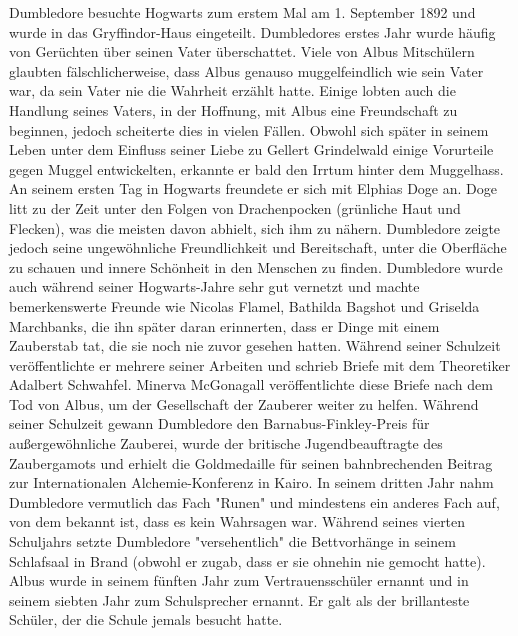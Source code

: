 \documentclass[a4paper, 10pt]{article}
\begin{document}
Dumbledore besuchte Hogwarts zum erstem Mal am 1. September 1892 und wurde in das Gryffindor-Haus eingeteilt. Dumbledores erstes Jahr wurde häufig von Gerüchten über seinen Vater überschattet. Viele von Albus Mitschülern glaubten fälschlicherweise, dass Albus genauso muggelfeindlich wie sein Vater war, da sein Vater nie die Wahrheit erzählt hatte. Einige lobten auch die Handlung seines Vaters, in der Hoffnung, mit Albus eine Freundschaft zu beginnen, jedoch scheiterte dies in vielen Fällen. Obwohl sich später in seinem Leben unter dem Einfluss seiner Liebe zu Gellert Grindelwald einige Vorurteile gegen Muggel entwickelten, erkannte er bald den Irrtum hinter dem Muggelhass.
\vspace{10pt}
\newline
An seinem ersten Tag in Hogwarts freundete er sich mit Elphias Doge an. Doge litt zu der Zeit unter den Folgen von Drachenpocken (grünliche Haut und Flecken), was die meisten davon abhielt, sich ihm zu nähern. Dumbledore zeigte jedoch seine ungewöhnliche Freundlichkeit und Bereitschaft, unter die Oberfläche zu schauen und innere Schönheit in den Menschen zu finden. Dumbledore wurde auch während seiner Hogwarts-Jahre sehr gut vernetzt und machte bemerkenswerte Freunde wie Nicolas Flamel, Bathilda Bagshot und Griselda Marchbanks, die ihn später daran erinnerten, dass er Dinge mit einem Zauberstab tat, die sie noch nie zuvor gesehen hatten. Während seiner Schulzeit veröffentlichte er mehrere seiner Arbeiten und schrieb Briefe mit dem Theoretiker Adalbert Schwahfel. Minerva McGonagall veröffentlichte diese Briefe nach dem Tod von Albus, um der Gesellschaft der Zauberer weiter zu helfen.
\vspace{10pt}
\newline
Während seiner Schulzeit gewann Dumbledore den Barnabus-Finkley-Preis für außergewöhnliche Zauberei, wurde der britische Jugendbeauftragte des Zaubergamots und erhielt die Goldmedaille für seinen bahnbrechenden Beitrag zur Internationalen Alchemie-Konferenz in Kairo.
\vspace{10pt}
\newline
In seinem dritten Jahr nahm Dumbledore vermutlich das Fach "Runen" und mindestens ein anderes Fach auf, von dem bekannt ist, dass es kein Wahrsagen war.
\vspace{10pt}
\newline
Während seines vierten Schuljahrs setzte Dumbledore "versehentlich" die Bettvorhänge in seinem Schlafsaal in Brand (obwohl er zugab, dass er sie ohnehin nie gemocht hatte).
\vspace{10pt}
\newline
Albus wurde in seinem fünften Jahr zum Vertrauensschüler ernannt und in seinem siebten Jahr zum Schulsprecher ernannt. Er galt als der brillanteste Schüler, der die Schule jemals besucht hatte.
\end{document}
